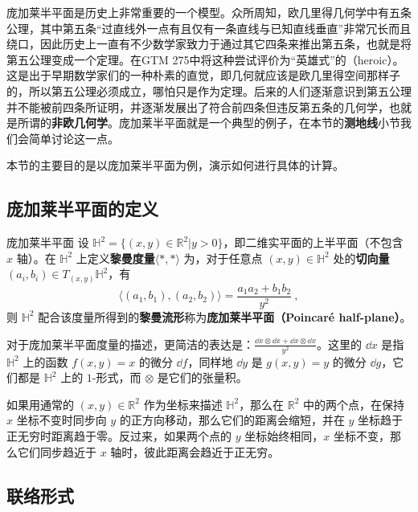 
庞加莱半平面是历史上非常重要的一个模型。众所周知，欧几里得几何学中有五条公理，其中第五条“过直线外一点有且仅有一条直线与已知直线垂直”非常冗长而且绕口，因此历史上一直有不少数学家致力于通过其它四条来推出第五条，也就是将第五公理变成一个定理。在GTM 275\cite{GTM275}中将这种尝试评价为“英雄式”的（heroic）。这是出于早期数学家们的一种朴素的直觉，即几何就应该是欧几里得空间那样子的，所以第五公理必须成立，哪怕只是作为定理。后来的人们逐渐意识到第五公理并不能被前四条所证明，并逐渐发展出了符合前四条但违反第五条的几何学，也就是所谓的\textbf{非欧几何学}。庞加莱半平面就是一个典型的例子，在本节的\textbf{测地线}小节我们会简单讨论这一点。

本节的主要目的是以庞加莱半平面为例，演示如何进行具体的计算。

\subsection{庞加莱半平面的定义}

\begin{definition}{庞加莱半平面}
设 $\mathbb{H}^2=\{(x, y)\in \mathbb{R}^2|y>0\}$，即二维实平面的上半平面（不包含 $x$ 轴）。在 $\mathbb{H}^2$ 上定义\textbf{黎曼度量}$\langle*,*\rangle$ 为，对于任意点 $(x, y)\in \mathbb{H}^2$ 处的\textbf{切向量}$(a_i, b_i)\in T_{(x, y)}\mathbb{H}^2$，有
\begin{equation}
\langle(a_1, b_1), (a_2, b_2)\rangle=\frac{a_1a_2+b_1b_2}{y^2}~,
\end{equation}
则 $\mathbb{H}^2$ 配合该度量所得到的\textbf{黎曼流形}称为\textbf{庞加莱半平面（Poincaré half-plane）}。
\end{definition}

对于庞加莱半平面度量的描述，更简洁的表达是：$\frac{\dd x\otimes \dd x+ \dd x\otimes\dd x}{y^2}$。这里的 $\dd x$ 是指 $\mathbb{H}^2$ 上的函数 $f(x, y)=x$ 的微分 $\dd f$，同样地 $\dd y$ 是 $g(x, y)=y$ 的微分 $\dd g$，它们都是 $\mathbb{H}^2$ 上的 $1$-形式，而 $\otimes$ 是它们的张量积。

如果用通常的 $(x, y)\in \mathbb{R}^2$ 作为坐标来描述 $\mathbb{H}^2$，那么在 $\mathbb{R}^2$ 中的两个点，在保持 $x$ 坐标不变时同步向 $y$ 的正方向移动，那么它们的距离会缩短，并在 $y$ 坐标趋于正无穷时距离趋于零。反过来，如果两个点的 $y$ 坐标始终相同，$x$ 坐标不变，那么它们同步趋近于 $x$ 轴时，彼此距离会趋近于正无穷。

\subsection{联络形式}

